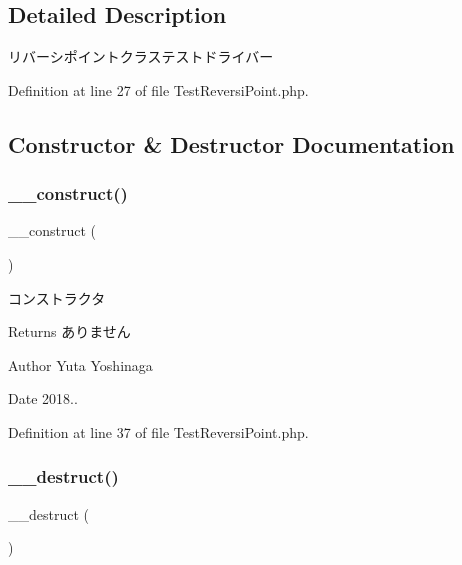 \subsection{Detailed Description}
リバーシポイントクラステストドライバー 

Definition at line 27 of file Test\+Reversi\+Point.\+php.



\subsection{Constructor \& Destructor Documentation}
\mbox{\label{class_test_reversi_point_a095c5d389db211932136b53f25f39685}} 
\subsubsection{\texorpdfstring{\+\_\+\+\_\+construct()}{\_\_construct()}}
{\footnotesize\ttfamily \+\_\+\+\_\+construct (\begin{DoxyParamCaption}{ }\end{DoxyParamCaption})}



コンストラクタ 

\begin{DoxyReturn}{Returns}
ありません 
\end{DoxyReturn}
\begin{DoxyAuthor}{Author}
Yuta Yoshinaga 
\end{DoxyAuthor}
\begin{DoxyDate}{Date}
2018.. 
\end{DoxyDate}


Definition at line 37 of file Test\+Reversi\+Point.\+php.

\mbox{\label{class_test_reversi_point_a421831a265621325e1fdd19aace0c758}} 
\subsubsection{\texorpdfstring{\+\_\+\+\_\+destruct()}{\_\_destruct()}}
{\footnotesize\ttfamily \+\_\+\+\_\+destruct (\begin{DoxyParamCaption}{ }\end{DoxyParamCaption})}



